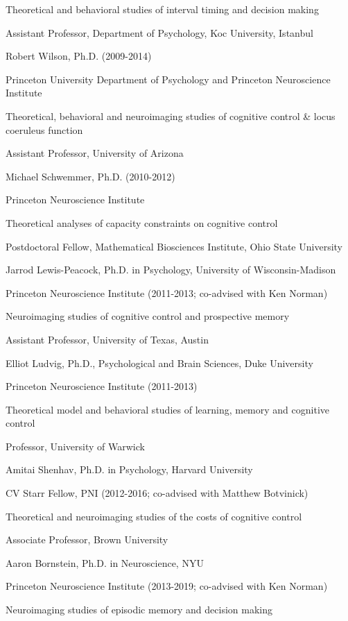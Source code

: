 \documentclass[10 pt]{article}
\begin{document}
Theoretical and behavioral studies of interval timing and decision making

Assistant Professor, Department of Psychology, Koc University, Istanbul
    \medskip

Robert Wilson, Ph.D. (2009-2014)

Princeton University Department of Psychology and Princeton Neuroscience Institute

Theoretical, behavioral and neuroimaging studies of cognitive control \& locus coeruleus function

Assistant Professor, University of Arizona
    \medskip

Michael Schwemmer, Ph.D. (2010-2012)

Princeton Neuroscience Institute

Theoretical analyses of capacity constraints on cognitive control

Postdoctoral Fellow, Mathematical Biosciences Institute, Ohio State University
    \medskip

Jarrod Lewis-Peacock, Ph.D. in Psychology, University of Wisconsin-Madison

Princeton Neuroscience Institute (2011-2013; co-advised with Ken Norman)

Neuroimaging studies of cognitive control and prospective memory

Assistant Professor, University of Texas, Austin
    \medskip

Elliot Ludvig, Ph.D., Psychological and Brain Sciences, Duke University

Princeton Neuroscience Institute (2011-2013)

Theoretical model and behavioral studies of learning, memory and cognitive control

Professor, University of Warwick
    \medskip

Amitai Shenhav, Ph.D. in Psychology, Harvard University

CV Starr Fellow, PNI (2012-2016; co-advised with Matthew Botvinick)

Theoretical and neuroimaging studies of the costs of cognitive control

Associate Professor, Brown University
    \medskip

Aaron Bornstein, Ph.D. in Neuroscience, NYU

Princeton Neuroscience Institute (2013-2019; co-advised with Ken Norman)

Neuroimaging studies of episodic memory and decision making
\end{document}

